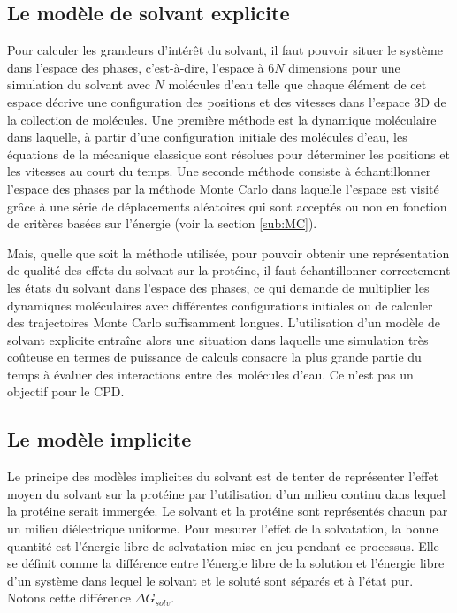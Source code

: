 \subsection{Le modèle de solvant explicite}

Pour calculer les grandeurs d'intérêt du solvant, il faut pouvoir situer le système dans l'espace des phases, c'est-à-dire, l'espace à $6 N$ dimensions pour une simulation du solvant avec $N$ molécules d'eau telle que chaque élément de cet espace décrive une configuration des positions et des vitesses dans l'espace 3D de la collection de molécules.
Une première méthode est la dynamique moléculaire dans laquelle, à partir d'une configuration initiale des molécules d'eau, les équations de la mécanique classique sont résolues pour déterminer les positions et les vitesses au court du temps. Une seconde méthode consiste à échantillonner l'espace des phases par la méthode Monte Carlo dans laquelle l'espace est visité grâce à une série de déplacements aléatoires qui sont acceptés ou non en fonction de critères basées sur l'énergie (voir la section \ref{sub:MC}).

Mais, quelle que soit la méthode utilisée, pour pouvoir obtenir une représentation de qualité des effets du solvant sur la protéine, il faut échantillonner correctement les états du solvant dans l'espace des phases, ce qui demande de multiplier les dynamiques moléculaires avec différentes configurations initiales ou de calculer des trajectoires Monte Carlo suffisamment longues.
L'utilisation d'un modèle de solvant explicite entraîne alors une situation dans laquelle une simulation très coûteuse en termes de puissance de calculs consacre la plus grande partie du temps à évaluer des interactions entre des molécules d'eau. Ce n'est pas un objectif pour le CPD.

\subsection{Le modèle implicite}

Le principe des modèles implicites du solvant est de tenter de représenter l'effet moyen du solvant sur la protéine par l'utilisation d'un milieu continu dans lequel la protéine serait immergée. Le solvant et la protéine sont représentés chacun par un milieu diélectrique uniforme.
Pour mesurer l'effet de la solvatation, la bonne quantité est l'énergie libre de solvatation mise en jeu pendant ce processus. Elle se définit comme la différence entre l'énergie libre de la solution et l'énergie libre d'un système dans lequel le solvant et le soluté sont séparés et à l'état pur. Notons cette différence $\Delta G_{solv}$.

